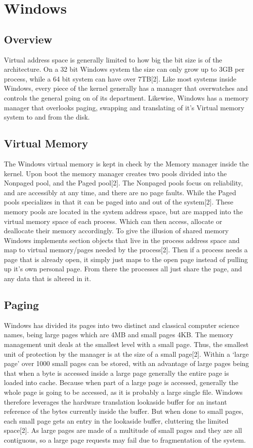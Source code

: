 \documentclass{article}
\begin{document}
\section{Windows}
\subsection{Overview}
		Virtual address space is generally limited to how big the bit size is of the architecture. On a 32 bit Windows system the size can only grow up to 3GB per process, while a 64 bit system can have over 7TB[2]. Like most systems inside Windows, every piece of the kernel generally has a manager that overwatches and controls the general going on of its department. Likewise, Windows has a memory manager that overlooks paging, swapping and translating of it’s Virtual memory system to and from the disk. 

\subsection{Virtual Memory}
        The Windows virtual memory is kept in check by the Memory manager inside the kernel. Upon boot the memory manager creates two pools divided into the Nonpaged pool, and the Paged pool[2]. The Nonpaged pools focus on reliability, and are accessibly at any time, and there are no page faults. While the Paged pools specializes in that it can be paged into and out of the system[2]. These memory pools are located in the system address space, but are mapped into the virtual memory space of each process. Which can then access,  allocate or deallocate their memory accordingly. To give the illusion of shared memory Windows implements section objects that live in the process address space and map to virtual memory/pages needed by the process[2]. Then if a process needs a page that is already open, it simply just maps to the open page instead of pulling up it’s own personal page. From there the processes all just share the page, and any data that is altered in it.

\subsection{Paging}
		Windows has divided its pages into two distinct and classical computer science names, being large pages which are 4MB and small pages 4KB. The memory management unit deals at the smallest level with a small page. Thus, the smallest unit of protection by the manager is at the size of a small page[2]. Within a ‘large page’ over 1000 small pages can be stored, with an advantage of large pages being that when a byte is accessed inside a large page generally the entire page is loaded into cache. Because when part of a large page is accessed, generally the whole page is going to be accessed, as it is probably a large single file. Windows therefore leverages the hardware translation lookaside buffer for an instant reference of the bytes currently inside the buffer. But when done to small pages, each small page gets an entry in the lookaside buffer, cluttering the limited space[2]. As large pages are made of a multitude of small pages and they are all contiguous, so a large page requests may fail due to fragmentation of the system.
\end{document}
